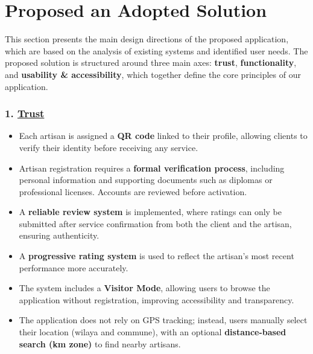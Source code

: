 \documentclass[12pt,a4paper]{report}
\begin{document}
\section{Proposed an Adopted Solution}
This section presents the main design directions of the proposed application, which are based on the analysis of existing systems and identified user needs. The proposed solution is structured around three main axes: \textbf{trust}, \textbf{functionality}, and \textbf{usability \& accessibility}, which together define the core principles of our application.

\subsubsection{\large1. \underline{Trust}}
\begin{itemize}
    \item[$\bullet$] Each artisan is assigned a \textbf{QR code} linked to their profile, allowing clients to verify their identity before receiving any service.
    
    \item[$\bullet$] Artisan registration requires a \textbf{formal verification process}, including personal information and supporting documents such as diplomas or professional licenses. Accounts are reviewed before activation.
    
    \item [$\bullet$] A \textbf{reliable review system} is implemented, where ratings can only be submitted after service confirmation from both the client and the artisan, ensuring authenticity.
    
    \item[$\bullet$] A \textbf{progressive rating system} is used to reflect the artisan’s most recent performance more accurately.
    
    \item[$\bullet$] The system includes a \textbf{Visitor Mode}, allowing users to browse the application without registration, improving accessibility and transparency.
    
    \item[$\bullet$] The application does not rely on GPS tracking; instead, users manually select their location (wilaya and commune), with an optional \textbf{distance-based search (km zone)} to find nearby artisans.
\end{itemize}
\end{document}
